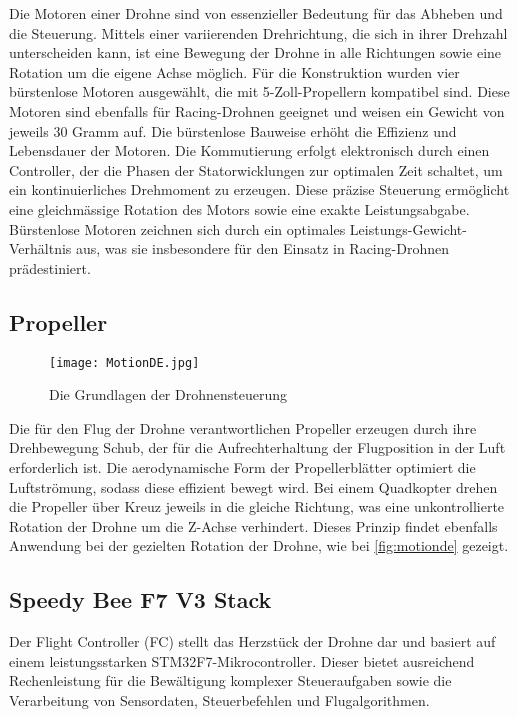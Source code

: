 Die Motoren einer Drohne sind von essenzieller Bedeutung für das Abheben und die Steuerung. Mittels einer variierenden Drehrichtung, die sich in ihrer Drehzahl unterscheiden kann, ist eine Bewegung der Drohne in alle Richtungen sowie eine Rotation um die eigene Achse möglich. Für die Konstruktion wurden vier bürstenlose Motoren ausgewählt, die mit 5-Zoll-Propellern kompatibel sind. Diese Motoren sind ebenfalls für Racing-Drohnen geeignet und weisen ein Gewicht von jeweils 30 Gramm auf. \cite{Motorenkauf} Die bürstenlose Bauweise erhöht die Effizienz und Lebensdauer der Motoren. Die Kommutierung erfolgt elektronisch durch einen Controller, der die Phasen der Statorwicklungen zur optimalen Zeit schaltet, um ein kontinuierliches Drehmoment zu erzeugen. \cite{Motorenstudy} Diese präzise Steuerung ermöglicht eine gleichmässige Rotation des Motors sowie eine exakte Leistungsabgabe. Bürstenlose Motoren zeichnen sich durch ein optimales Leistungs-Gewicht-Verhältnis aus, was sie insbesondere für den Einsatz in Racing-Drohnen prädestiniert.


\subsection{Propeller}\label{sec:Propeller} 
\begin{wrapfigure}{r}{0.3\textwidth}  %
	\centering
	\texttt{[image: MotionDE.jpg]} %
	\caption{Die Grundlagen der Drohnensteuerung}
	\label{fig:motionde}
\end{wrapfigure}
Die für den Flug der Drohne verantwortlichen Propeller erzeugen durch ihre Drehbewegung Schub, der für die Aufrechterhaltung der Flugposition in der Luft erforderlich ist. Die aerodynamische Form der Propellerblätter optimiert die Luftströmung, sodass diese effizient bewegt wird. Bei einem Quadkopter drehen die Propeller über Kreuz jeweils in die gleiche Richtung, was eine unkontrollierte Rotation der Drohne um die Z-Achse verhindert. Dieses Prinzip findet ebenfalls Anwendung bei der gezielten Rotation der Drohne, wie bei \autoref{fig:motionde} gezeigt.

\subsection{Speedy Bee F7 V3 Stack}  \label{sec:F7V3}
Der Flight Controller (FC) stellt das Herzstück der Drohne dar und basiert auf einem leistungsstarken STM32F7-Mikrocontroller. Dieser bietet ausreichend Rechenleistung für die Bewältigung komplexer Steueraufgaben sowie die Verarbeitung von Sensordaten, Steuerbefehlen und Flugalgorithmen. \cite{Stack}

